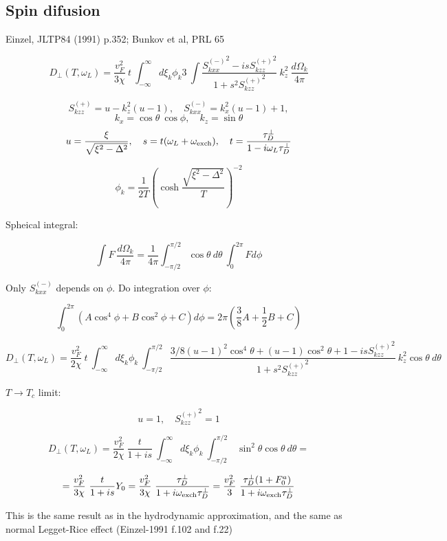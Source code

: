 \documentclass[a4paper]{article}
\begin{document}
\subsection*{Spin difusion}

\def\tdp{\tau_D^\perp}
\def\ol{\omega_L}
\def\oe{\omega_{\rm exch}}
\def\sm{S_{kxx}^{(-)}}
\def\sp{S_{kzz}^{(+)}}

Einzel, JLTP84 (1991) p.352; Bunkov et al, PRL 65

$$
D_\perp (T, \ol) =
  \frac{v_F^2}{3\chi}\ t
  \ \int_{-\infty}^{\infty}
  d\xi_k\phi_k 3
  \ \int \frac{{\sm}^2 - is{\sp}^2}{1+s^2{\sp}^2}
  \  k_z^2\ \frac{d\Omega_k}{4\pi}
$$

$$
\sp = u - k_z^2(u-1),\quad
\sm = k_x^2(u-1) + 1,
$$
$$
k_x = \cos\theta\ \cos\phi, \quad
k_z = \sin\theta
$$
$$
u=\frac{\xi}{\sqrt{\xi^2-\Delta^2}}, \quad
s = t(\ol+\oe),\quad
t = \frac{\tdp}{1-i\ol\tdp}
$$

$$
\phi_k = \frac{1}{2T}\left(\cosh\frac{\sqrt{\xi^2-\Delta^2}}{T}\right)^{-2}
$$

Spheical integral:

$$
\int F\ \frac{d\Omega_k}{4\pi} =
  \frac1{4\pi}\int_{-\pi/2}^{\pi/2} \cos\theta\ d\theta
  \ \int_0^{2\pi} F d\phi
$$

Only $\sm$ depends on $\phi$. Do integration over $\phi$:

$$
\int_0^{2\pi} (A\cos^4\phi + B\cos^2\phi + C) d\phi =
2\pi(\frac38 A + \frac12 B + C)
$$


$$
D_\perp (T, \ol) =
  \frac{v_F^2}{2\chi}\ t
  \ \int_{-\infty}^{\infty}
  d\xi_k\phi_k
  \ \int_{-\pi/2}^{\pi/2}
   \frac{3/8(u-1)^2\cos^4\theta + (u-1)\cos^2\theta + 1 - is{\sp}^2}{1+s^2{\sp}^2}
  \  k_z^2 \cos\theta \ d\theta
$$

$T\rightarrow T_c$ limit:

$$
u=1,\quad
{\sp}^2 = 1
$$

$$
D_\perp (T, \ol) =
  \frac{v_F^2}{2\chi}
  \ \frac{t}{1+is}
  \ \int_{-\infty}^{\infty}
  d\xi_k\phi_k
  \ \int_{-\pi/2}^{\pi/2}
  \  \sin^2\theta \cos\theta \ d\theta =
$$

$$
  = \frac{v_F^2}{3\chi} \ \frac{t}{1+is} Y_0
  = \frac{v_F^2}{3\chi} \ \frac{\tdp}{1+i\oe\tdp}
  = \frac{v_F^2}{3}\ \frac{\tdp (1+F_0^a)}{1+i\oe\tdp}
$$

This is the same result as in the hydrodynamic approximation,
and the same as normal Legget-Rice effect (Einzel-1991 f.102 and f.22)
\end{document}
